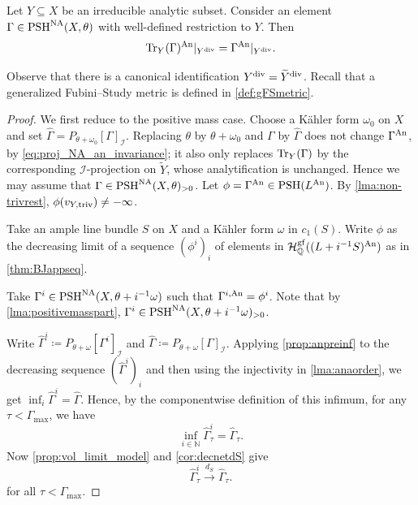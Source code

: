 \begin{theorem}\label{thm:comp_traceop}
    Let $Y\subseteq X$ be an irreducible analytic subset.
    Consider an element $\Gamma\in \mathrm{PSH}^{\mathrm{NA}}(X,\theta)$ with well-defined restriction to $Y$. Then
    \begin{equation}\label{eq:Tracena}
    \operatorname{Tr}_Y(\Gamma)^{\mathrm{An}}|_{Y^{\operatorname{div}}}=\Gamma^{\mathrm{An}}|_{Y^{\operatorname{div}}}.
    \end{equation}
\end{theorem}
Observe that there is a canonical identification $Y^{\operatorname{div}}=\widetilde{Y}^{\operatorname{div}}$. Recall that a generalized Fubini--Study metric is defined in \cref{def:gFSmetric}.

\begin{proof}
    We first reduce to the positive mass case. Choose a K\"ahler form $\omega_0$ on $X$ and set $\widehat{\Gamma}=P_{\theta+\omega_0}[\Gamma]_{\mathcal{I}}$. Replacing $\theta$ by $\theta+\omega_0$ and $\Gamma$ by $\widehat{\Gamma}$ does not change $\Gamma^{\mathrm{An}}$, by \eqref{eq:proj_NA_an_invariance}; it also only replaces $\operatorname{Tr}_Y(\Gamma)$ by the corresponding $\mathcal{I}$-projection on $\widetilde{Y}$, whose analytification is unchanged. Hence we may assume that $\Gamma\in \mathrm{PSH}^{\mathrm{NA}}(X,\theta)_{>0}$.
    Let $\phi=\Gamma^{\mathrm{An}}\in \mathrm{PSH}(L^{\mathrm{An}})$. By \cref{lma:non-trivrest}, $\phi(v_{Y,\mathrm{triv}})\neq -\infty$.

    Take an ample line bundle $S$ on $X$ and a K\"ahler form $\omega$ in $c_1(S)$.
    Write $\phi$ as the decreasing limit of a sequence $(\phi^{i})_i$ of elements in $\mathcal{H}^{\mathrm{gf}}_{\mathbb{Q}}((L+i^{-1}S)^{\mathrm{An}})$ as in \cref{thm:BJappseq}.

    Take $\Gamma^{i}\in \mathrm{PSH}^{\mathrm{NA}}(X,\theta+i^{-1}\omega)$ such that $\Gamma^{i,\mathrm{An}}=\phi^{i}$. Note that by \cref{lma:positivemasspart}, $\Gamma^i\in \mathrm{PSH}^{\mathrm{NA}}(X,\theta+i^{-1}\omega)_{>0}$.

    Write $\widehat{\Gamma}^i\coloneqq P_{\theta+\omega}[\Gamma^i]_{\mathcal{I}}$ and $\widehat{\Gamma}\coloneqq P_{\theta+\omega}[\Gamma]_{\mathcal{I}}$. Applying \cref{prop:anpreinf} to the decreasing sequence $(\widehat{\Gamma}^i)_i$ and then using the injectivity in \cref{lma:anaorder}, we get $\inf_i\widehat{\Gamma}^i=\widehat{\Gamma}$. Hence, by the componentwise definition of this infimum, for any $\tau<\Gamma_{\max}$, we have
    \[
    \inf_{i\in \mathbb{N}}\widehat{\Gamma}^{i}_{\tau}=\widehat{\Gamma}_{\tau}.
    \]
    Now \cref{prop:vol_limit_model} and \cref{cor:decnetdS} give
    \[
        \widehat{\Gamma}^{i}_{\tau}\xrightarrow{d_S} \widehat{\Gamma}_{\tau}.
    \]
    for all $\tau<\Gamma_{\max}$.


\end{proof}
